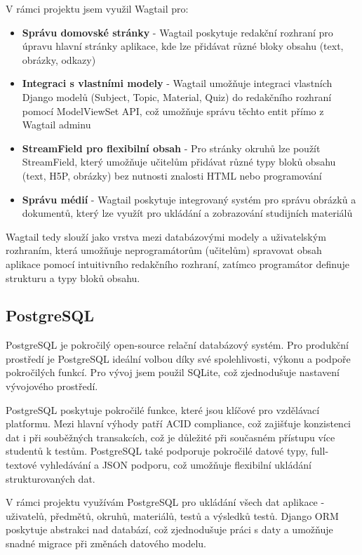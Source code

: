 \documentclass[a4paper,12pt]{article}
\begin{document}
V rámci projektu jsem využil Wagtail pro:
\begin{itemize}
    \item \textbf{Správu domovské stránky} - Wagtail poskytuje redakční rozhraní pro úpravu hlavní stránky aplikace, kde lze přidávat různé bloky obsahu (text, obrázky, odkazy)
    \item \textbf{Integraci s vlastními modely} - Wagtail umožňuje integraci vlastních Django modelů (Subject, Topic, Material, Quiz) do redakčního rozhraní pomocí ModelViewSet API, což umožňuje správu těchto entit přímo z Wagtail adminu
    \item \textbf{StreamField pro flexibilní obsah} - Pro stránky okruhů lze použít StreamField, který umožňuje učitelům přidávat různé typy bloků obsahu (text, H5P, obrázky) bez nutnosti znalosti HTML nebo programování
    \item \textbf{Správu médií} - Wagtail poskytuje integrovaný systém pro správu obrázků a dokumentů, který lze využít pro ukládání a zobrazování studijních materiálů
\end{itemize}

Wagtail tedy slouží jako vrstva mezi databázovými modely a uživatelským rozhraním, která umožňuje neprogramátorům (učitelům) spravovat obsah aplikace pomocí intuitivního redakčního rozhraní, zatímco programátor definuje strukturu a typy bloků obsahu.

\subsection{PostgreSQL}

PostgreSQL je pokročilý open-source relační databázový systém. Pro produkční prostředí je PostgreSQL ideální volbou díky své spolehlivosti, výkonu a podpoře pokročilých funkcí. Pro vývoj jsem použil SQLite, což zjednodušuje nastavení vývojového prostředí.

PostgreSQL poskytuje pokročilé funkce, které jsou klíčové pro vzdělávací platformu. Mezi hlavní výhody patří ACID compliance, což zajišťuje konzistenci dat i při souběžných transakcích, což je důležité při současném přístupu více studentů k testům. PostgreSQL také podporuje pokročilé datové typy, full-textové vyhledávání a JSON podporu, což umožňuje flexibilní ukládání strukturovaných dat.

V rámci projektu využívám PostgreSQL pro ukládání všech dat aplikace - uživatelů, předmětů, okruhů, materiálů, testů a výsledků testů. Django ORM poskytuje abstrakci nad databází, což zjednodušuje práci s daty a umožňuje snadné migrace při změnách datového modelu.
\end{document}

